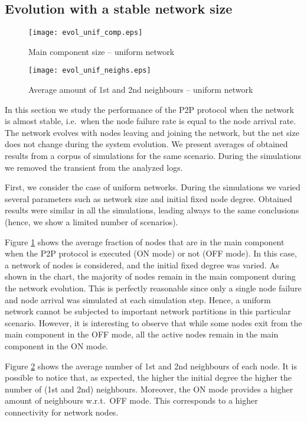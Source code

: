 \documentclass{www13-companion-accepted}
\begin{document}
\subsection{Evolution with a stable network size}


\begin{figure}[thbp]
   \centering
   \texttt{[image: evol\_unif\_comp.eps]}
\caption{Main component size -- uniform network}
   \label{fig:evoluzione_unif_comp}
\end{figure}

\begin{figure}[thbp]
   \centering
   \texttt{[image: evol\_unif\_neighs.eps]}
\caption{Average amount of 1st and 2nd neighbours -- uniform network}
   \label{fig:evoluzione_unif_neighs}
\end{figure}

In this section we study the performance of the P2P protocol when the network is almost stable, i.e.~when the node failure rate is equal to the node arrival rate. The network evolves with nodes leaving and joining the network, but the net size does not change during the system evolution.
We present averages of obtained results from a corpus of  simulations for the same scenario. During the simulations we removed the transient from the analyzed logs.

First, we consider the case of uniform networks. During the simulations we varied several parameters such as network size and initial fixed node degree. Obtained results were similar in all the simulations, leading always to the same conclusions (hence, we show a limited number of scenarios). 

Figure \ref{fig:evoluzione_unif_comp} shows the average fraction of nodes that are in the main component when the P2P protocol is executed (ON mode) or not (OFF mode).
In this case, a network of  nodes is considered, and the initial fixed degree was varied. 
As shown in the chart, the majority of nodes remain in the main component during the network evolution. This is perfectly reasonable since only a single node failure and node arrival was simulated at each simulation step. Hence, a uniform network cannot be subjected to important network partitions in this particular scenario. However, it is interesting to observe that while some nodes exit from the main component in the OFF mode, all the active nodes remain in the main component in the ON mode.

Figure \ref{fig:evoluzione_unif_neighs} shows the average number of 1st and 2nd neighbours of each node. It is possible to notice that, as expected, the higher the initial degree the higher the number of (1st and 2nd) neighbours. Moreover, the ON mode provides a higher amount of neighbours w.r.t.~OFF mode. This corresponds to a higher connectivity for network nodes.
\end{document}
